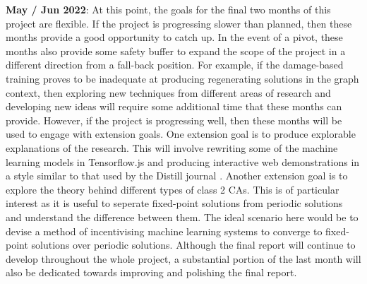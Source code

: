 \textbf{May / Jun 2022}: At this point, the goals for the final two months of this project are flexible. If the project is progressing slower than planned, then these months provide a good opportunity to catch up. In the event of a pivot, these months also provide some safety buffer to expand the scope of the project in a different direction from a fall-back position. For example, if the damage-based training proves to be inadequate at producing regenerating solutions in the graph context, then exploring new techniques from different areas of research and developing new ideas will require some additional time that these months can provide.
However, if the project is progressing well, then these months will be used to engage with extension goals.
One extension goal is to produce explorable explanations of the research.
This will involve rewriting some of the machine learning models in Tensorflow.js and producing interactive web demonstrations in a style similar to that used by the Distill journal \cite{distill}.
Another extension goal is to explore the theory behind different types of class 2 CAs.
This is of particular interest as it is useful to seperate fixed-point solutions from periodic solutions and understand the difference between them.
The ideal scenario here would be to devise a method of incentivising machine learning systems to converge to fixed-point solutions over periodic solutions.
Although the final report will continue to develop throughout the whole project, a substantial portion of the last month will also be dedicated towards improving and polishing the final report.
    